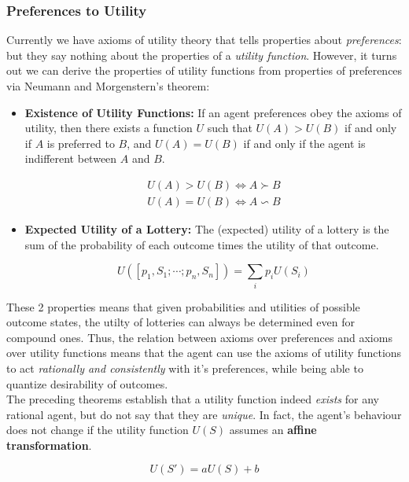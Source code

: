 \documentclass[11pt]{article}
\begin{document}
\subsubsection{Preferences to Utility}

Currently we have axioms of utility theory that tells properties about \textit{preferences}: but they say nothing about the properties of a \textit{utility function}. However, it turns out we can derive the properties of utility functions from properties of preferences via Neumann and Morgenstern's theorem:

\begin{itemize}
    \item \textbf{Existence of Utility Functions:} If an agent preferences obey the axioms of utility, then there exists a function $U$ such that $U(A) > U(B)$ if and only if $A$ is preferred to $B$, and $U(A) = U(B)$ if and only if the agent is indifferent between $A$ and $B$.
    
    $$
    \begin{gathered}
    U(A) > U(B) \iff A \succ B\\
    U(A) = U(B) \iff A \backsim B
    \end{gathered}
    $$
    \item \textbf{Expected Utility of a Lottery:} The (expected) utility of a lottery is the sum of the probability of each outcome times the utility of that outcome.
    
    $$
    U([p_1, S_1; \cdots; p_n, S_n]) = \sum_i p_i U(S_i)
    $$
    
\end{itemize}

These 2 properties means that given probabilities and utilities of possible outcome states, the utilty of lotteries can always be determined even for compound ones. Thus, the relation between axioms over preferences and axioms over utility functions means that the agent can use the axioms of utility functions to act \textit{rationally and consistently} with it's preferences, while being able to quantize desirability of outcomes.\\

The preceding theorems establish that a utility function indeed \textit{exists} for any rational agent, but do not say that they are \textit{unique}. In fact, the agent's behaviour does not change if the utility function $U(S)$ assumes an \textbf{affine transformation}.

$$
U(S') = aU(S) + b
$$
\end{document}

